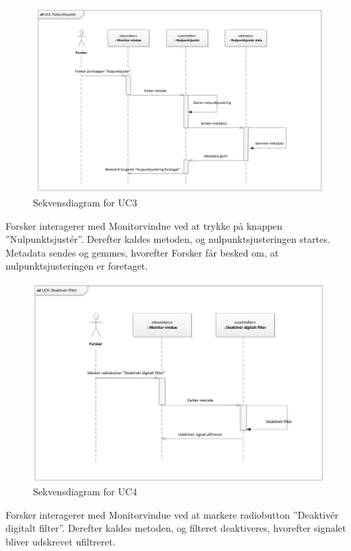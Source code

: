 \begin{figure}[H]
	\centering
	\includegraphics[width=1\textwidth]{Figurer/Snip20151104_33}
	\caption{Sekvensdiagram for UC3}
\end{figure}

Forsker interagerer med Monitorvindue ved at trykke på knappen ”Nulpunktsjustér”. Derefter kaldes metoden, og nulpunktsjusteringen startes. Metadata sendes og gemmes, hvorefter Forsker får besked om, at nulpunktsjusteringen er foretaget. 

\begin{figure}[H]
	\centering
	\includegraphics[width=1\textwidth]{Figurer/Snip20151104_34}
	\caption{Sekvensdiagram for UC4}
\end{figure}

Forsker interagerer med Monitorvindue ved at markere radiobutton ”Deaktivér digitalt filter”. Derefter kaldes metoden, og filteret deaktiveres, hvorefter signalet bliver udskrevet ufiltreret.

